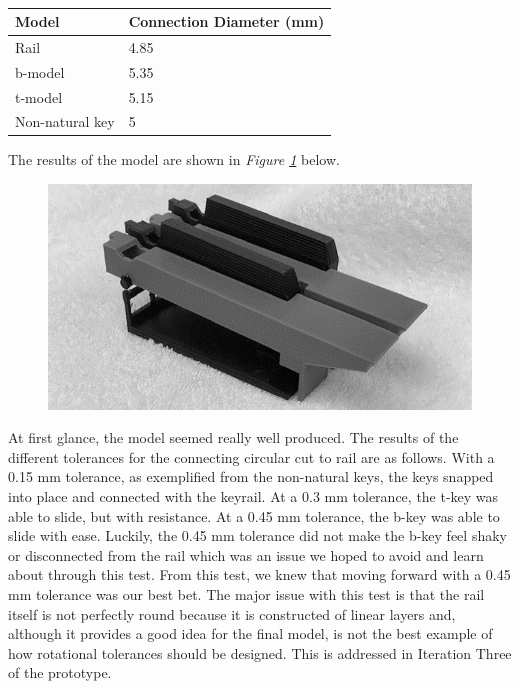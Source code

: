 \begin{table}[]
  \centering
  \begin{tabular}{|l|l|}
    \hline
    Model           & Connection Diameter (mm) \\ \hline
    Rail            & 4.85                     \\ \hline
    b-model         & 5.35                     \\ \hline
    t-model         & 5.15                     \\ \hline
    Non-natural key & 5                        \\ \hline
  \end{tabular}
  \caption{}
  \label{Tab:connections}
\end{table}

The results of the model are shown in \textit{Figure \ref{fig:print1}} below.

\begin{figure}[h!]
  \centering
  \includegraphics[width=0.8\linewidth]{image/Print1.png}
  \caption{}
  \label{fig:print1}
\end{figure}

At first glance, the model seemed really well produced. The results of the different tolerances for the connecting circular cut to rail are as follows. With a 0.15 mm tolerance, as exemplified from the non-natural keys, the keys snapped into place and connected with the keyrail. At a 0.3 mm tolerance, the t-key was able to slide, but with resistance. At a 0.45 mm tolerance, the b-key was able to slide with ease. Luckily, the 0.45 mm tolerance did not make the b-key feel shaky or disconnected from the rail which was an issue we hoped to avoid and learn about through this test. From this test, we knew that moving forward with a 0.45 mm tolerance was our best bet. The major issue with this test is that the rail itself is not perfectly round because it is constructed of linear layers and, although it provides a good idea for the final model, is not the best example of how rotational tolerances should be designed. This is addressed in Iteration Three of the prototype.

